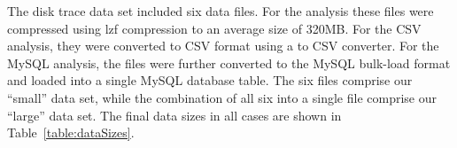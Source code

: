 The disk trace data set included six data files. For the \DataSeries{} 
analysis these files were compressed using lzf compression
to an average size of 320MB.  For the CSV analysis, they were
converted to CSV format using a \DataSeries{} to CSV converter.  For the
MySQL analysis, the files were further converted to the MySQL bulk-load
format and loaded into a single MySQL database table. The six files comprise
our ``small'' data set, while the combination of all six into a single
file comprise our ``large'' data set. The final data sizes
in all cases are shown in Table~\ref{table:dataSizes}. 






